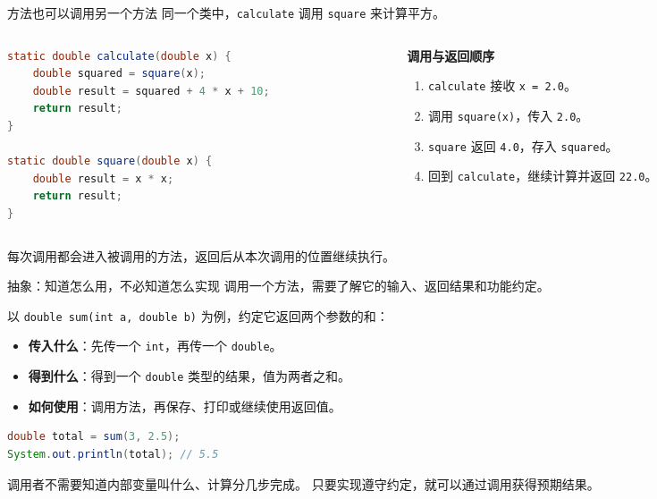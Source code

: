 \documentclass[aspectratio=169]{beamer}
\begin{document}
\begin{frame}[fragile]{方法也可以调用另一个方法}
  同一个类中，\texttt{calculate} 调用 \texttt{square} 来计算平方。
  \par\medskip
  \begin{columns}[T,onlytextwidth]
    \begin{column}{0.64\textwidth}
      \begin{lstlisting}[language=Java]
static double calculate(double x) {
    double squared = square(x);
    double result = squared + 4 * x + 10;
    return result;
}

static double square(double x) {
    double result = x * x;
    return result;
}
      \end{lstlisting}
    \end{column}
    \begin{column}{0.32\textwidth}
      \textbf{调用与返回顺序}
      \begin{enumerate}
        \item \texttt{calculate} 接收 \texttt{x = 2.0}。
        \item 调用 \texttt{square(x)}，传入 \texttt{2.0}。
        \item \texttt{square} 返回 \texttt{4.0}，存入 \texttt{squared}。
        \item 回到 \texttt{calculate}，继续计算并返回 \texttt{22.0}。
      \end{enumerate}
    \end{column}
  \end{columns}
  每次调用都会进入被调用的方法，\alert{返回后从本次调用的位置继续执行}。
\end{frame}

\begin{frame}[fragile]{抽象：知道怎么用，不必知道怎么实现}
  调用一个方法，需要了解它的\alert{输入、返回结果和功能约定}。
  \par\medskip
  以 \texttt{double sum(int a, double b)} 为例，约定它返回两个参数的和：
  \begin{itemize}
    \item \textbf{传入什么}：先传一个 \texttt{int}，再传一个 \texttt{double}。
    \item \textbf{得到什么}：得到一个 \texttt{double} 类型的结果，值为两者之和。
    \item \textbf{如何使用}：调用方法，再保存、打印或继续使用返回值。
  \end{itemize}
  \begin{lstlisting}[language=Java]
double total = sum(3, 2.5);
System.out.println(total); // 5.5
  \end{lstlisting}
  调用者不需要知道内部变量叫什么、计算分几步完成。
  只要实现遵守约定，就可以通过调用获得预期结果。
\end{frame}
\end{document}
